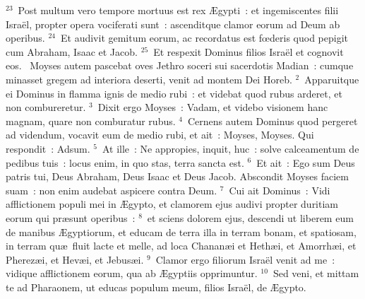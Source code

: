 ${}^{23}$~Post multum vero tempore mortuus est rex \AE gypti~: et ingemiscentes filii Isra\"el, propter opera vociferati sunt~: ascenditque clamor eorum ad Deum ab operibus.
${}^{24}$~Et audivit gemitum eorum, ac recordatus est fœderis quod pepigit cum Abraham, Isaac et Jacob.
${}^{25}$~Et respexit Dominus filios Isra\"el et cognovit eos.
~Moyses autem pascebat oves Jethro soceri sui sacerdotis Madian~: cumque minasset gregem ad interiora deserti, venit ad montem Dei Horeb.
${}^{2}$~Apparuitque ei Dominus in flamma ignis de medio rubi~: et videbat quod rubus arderet, et non combureretur.
${}^{3}$~Dixit ergo Moyses~: Vadam, et videbo visionem hanc magnam, quare non comburatur rubus.
${}^{4}$~Cernens autem Dominus quod pergeret ad videndum, vocavit eum de medio rubi, et ait~: Moyses, Moyses. Qui respondit~: Adsum.
${}^{5}$~At ille~: Ne appropies, inquit, huc~: solve calceamentum de pedibus tuis~: locus enim, in quo stas, terra sancta est.
${}^{6}$~Et ait~: Ego sum Deus patris tui, Deus Abraham, Deus Isaac et Deus Jacob. Abscondit Moyses faciem suam~: non enim audebat aspicere contra Deum.
${}^{7}$~Cui ait Dominus~: Vidi afflictionem populi mei in \AE gypto, et clamorem ejus audivi propter duritiam eorum qui pr\ae sunt operibus~:
${}^{8}$~et sciens dolorem ejus, descendi ut liberem eum de manibus \AE gyptiorum, et educam de terra illa in terram bonam, et spatiosam, in terram qu\ae\ fluit lacte et melle, ad loca Chanan\ae i et Heth\ae i, et Amorrh\ae i, et Pherez\ae i, et Hev\ae i, et Jebus\ae i.
${}^{9}$~Clamor ergo filiorum Isra\"el venit ad me~: vidique afflictionem eorum, qua ab \AE gyptiis opprimuntur.
${}^{10}$~Sed veni, et mittam te ad Pharaonem, ut educas populum meum, filios Isra\"el, de \AE gypto.


